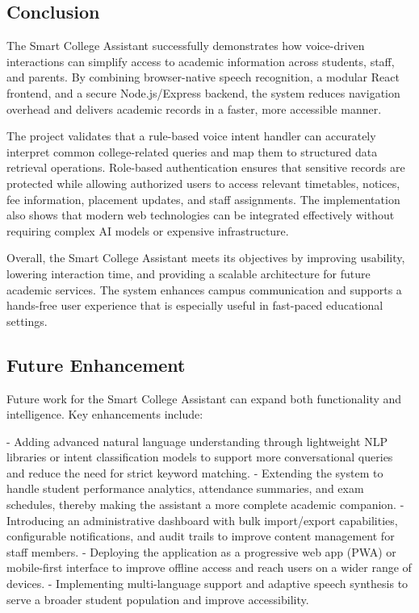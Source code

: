 \documentclass{article}
\begin{document}
\subsection{Conclusion}
The Smart College Assistant successfully demonstrates how voice-driven interactions can simplify access to academic information across students, staff, and parents. By combining browser-native speech recognition, a modular React frontend, and a secure Node.js/Express backend, the system reduces navigation overhead and delivers academic records in a faster, more accessible manner.

The project validates that a rule-based voice intent handler can accurately interpret common college-related queries and map them to structured data retrieval operations. Role-based authentication ensures that sensitive records are protected while allowing authorized users to access relevant timetables, notices, fee information, placement updates, and staff assignments. The implementation also shows that modern web technologies can be integrated effectively without requiring complex AI models or expensive infrastructure.

Overall, the Smart College Assistant meets its objectives by improving usability, lowering interaction time, and providing a scalable architecture for future academic services. The system enhances campus communication and supports a hands-free user experience that is especially useful in fast-paced educational settings.

\subsection{Future Enhancement}
Future work for the Smart College Assistant can expand both functionality and intelligence. Key enhancements include:

- Adding advanced natural language understanding through lightweight NLP libraries or intent classification models to support more conversational queries and reduce the need for strict keyword matching.
- Extending the system to handle student performance analytics, attendance summaries, and exam schedules, thereby making the assistant a more complete academic companion.
- Introducing an administrative dashboard with bulk import/export capabilities, configurable notifications, and audit trails to improve content management for staff members.
- Deploying the application as a progressive web app (PWA) or mobile-first interface to improve offline access and reach users on a wider range of devices.
- Implementing multi-language support and adaptive speech synthesis to serve a broader student population and improve accessibility.
\end{document}
